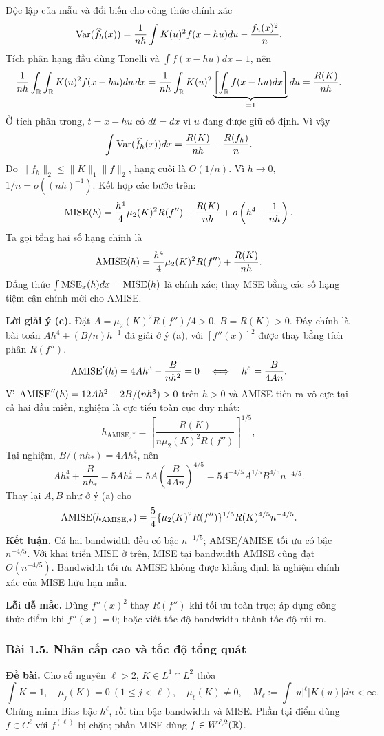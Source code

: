 Độc lập của mẫu và đổi biến cho công thức chính xác
\[
\operatorname{Var}(\widehat f_h(x))
=\frac1{nh}\int K(u)^2f(x-hu)du-\frac{f_h(x)^2}{n}.
\]
Tích phân hạng đầu dùng Tonelli và $\int f(x-hu)dx=1$, nên
\[
\frac1{nh}\int_{\mathbb R}\int_{\mathbb R}K(u)^2f(x-hu)du\,dx
=\frac1{nh}\int_{\mathbb R}K(u)^2
\underbrace{\left[\int_{\mathbb R}f(x-hu)dx\right]}_{=1}du
=\frac{R(K)}{nh}.
\]
Ở tích phân trong, $t=x-hu$ có $dt=dx$ vì $u$ đang được giữ cố định.
Vì vậy
\[
\int\operatorname{Var}(\widehat f_h(x))dx=\frac{R(K)}{nh}-\frac{R(f_h)}n.
\]
Do $\|f_h\|_2\leq\|K\|_1\|f\|_2$, hạng cuối là $O(1/n)$.
Vì $h\to0$, $1/n=o((nh)^{-1})$. Kết hợp các bước trên:
\[
\operatorname{MISE}(h)=\frac{h^4}{4}\mu_2(K)^2R(f'')+\frac{R(K)}{nh}
+o\left(h^4+\frac1{nh}\right).
\]
Ta gọi tổng hai số hạng chính là
\[
\operatorname{AMISE}(h)=\frac{h^4}{4}\mu_2(K)^2R(f'')+\frac{R(K)}{nh}.
\]
Đẳng thức $\int\operatorname{MSE}_x(h)dx=\operatorname{MISE}(h)$ là chính xác;
thay MSE bằng các số hạng tiệm cận chính mới cho AMISE.

\textbf{Lời giải ý (c).}
Đặt $A=\mu_2(K)^2R(f'')/4>0$, $B=R(K)>0$.
Đây chính là bài toán $Ah^4+(B/n)h^{-1}$ đã giải ở ý (a),
với $[f''(x)]^2$ được thay bằng tích phân $R(f'')$.
\[
\operatorname{AMISE}'(h)=4Ah^3-\frac{B}{nh^2}=0
\quad\Longleftrightarrow\quad h^5=\frac{B}{4An}.
\]
Vì $\operatorname{AMISE}''(h)=12Ah^2+2B/(nh^3)>0$ trên $h>0$ và AMISE
tiến ra vô cực tại cả hai đầu miền, nghiệm là cực tiểu toàn cục duy nhất:
\[
\boxed{h_{\mathrm{AMISE},*}
=\left[\frac{R(K)}{n\mu_2(K)^2R(f'')}\right]^{1/5},}
\]
Tại nghiệm, $B/(nh_*)=4Ah_*^4$, nên
\[
Ah_*^4+\frac{B}{nh_*}=5Ah_*^4
=5A\left(\frac{B}{4An}\right)^{4/5}
=5\,4^{-4/5}A^{1/5}B^{4/5}n^{-4/5}.
\]
Thay lại $A,B$ như ở ý (a) cho
\[
\operatorname{AMISE}(h_{\mathrm{AMISE},*})
=\frac54\{\mu_2(K)^2R(f'')\}^{1/5}R(K)^{4/5}n^{-4/5}.
\]
\textbf{Kết luận.} Cả hai bandwidth đều có bậc $n^{-1/5}$;
AMSE/AMISE tối ưu có bậc $n^{-4/5}$. Với khai triển MISE ở trên,
MISE tại bandwidth AMISE cũng đạt $O(n^{-4/5})$.
Bandwidth tối ưu AMISE không được khẳng định là nghiệm chính xác của MISE hữu hạn mẫu.

\textbf{Lỗi dễ mắc.} Dùng $f''(x)^2$ thay $R(f'')$ khi tối ưu toàn trục;
áp dụng công thức điểm khi $f''(x)=0$; hoặc viết tốc độ bandwidth thành tốc độ rủi ro.

\subsubsection*{Bài 1.5. Nhân cấp cao và tốc độ tổng quát}\label{ot45:highorder}
\textbf{Đề bài.} Cho số nguyên $\ell>2$, $K\in L^1\cap L^2$ thỏa
\[
\int K=1,\quad\mu_j(K)=0\ (1\leq j<\ell),\quad
\mu_\ell(K)\ne0,\quad M_\ell:=\int |u|^\ell|K(u)|du<\infty.
\]
Chứng minh Bias bậc $h^\ell$, rồi tìm bậc bandwidth và MISE.
Phần tại điểm dùng $f\in C^\ell$ với $f^{(\ell)}$ bị chặn;
phần MISE dùng $f\in W^{\ell,2}(\mathbb R)$.


